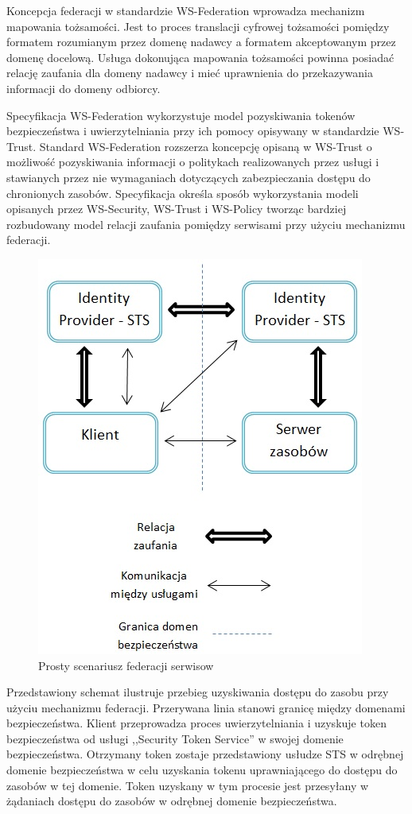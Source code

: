 		Koncepcja federacji w standardzie WS-Federation wprowadza mechanizm mapowania tożsamości. Jest to proces translacji cyfrowej tożsamości pomiędzy formatem rozumianym przez domenę nadawcy a formatem akceptowanym przez domenę docelową. Usługa dokonująca mapowania tożsamości powinna posiadać relację zaufania dla domeny nadawcy i mieć uprawnienia do przekazywania informacji do domeny odbiorcy.

		Specyfikacja WS-Federation wykorzystuje model pozyskiwania tokenów bezpieczeństwa i uwierzytelniania przy ich pomocy opisywany w standardzie WS-Trust. Standard WS-Federation rozszerza koncepcję opisaną w WS-Trust o możliwość pozyskiwania informacji o politykach realizowanych przez usługi i stawianych przez nie wymaganiach dotyczących zabezpieczania dostępu do chronionych zasobów. Specyfikacja określa sposób wykorzystania modeli opisanych przez WS-Security, WS-Trust i WS-Policy tworząc bardziej rozbudowany model relacji zaufania pomiędzy serwisami przy użyciu mechanizmu federacji.

		\begin{figure}[h]
			\centering
				\includegraphics{img/ws-federation.jpg}
			\caption{Prosty scenariusz federacji serwisow}
			\label{Prosty scenariusz federacji serwisów}
		\end{figure}

		Przedstawiony schemat ilustruje przebieg uzyskiwania dostępu do zasobu przy użyciu mechanizmu federacji. Przerywana linia stanowi granicę między domenami bezpieczeństwa. Klient przeprowadza proces uwierzytelniania  i uzyskuje token bezpieczeństwa od usługi ,,Security Token Service'' w swojej domenie bezpieczeństwa. Otrzymany token zostaje przedstawiony usłudze STS w odrębnej domenie bezpieczeństwa w celu uzyskania tokenu uprawniającego do dostępu do zasobów w tej domenie. Token uzyskany w tym procesie jest przesyłany w żądaniach dostępu do zasobów w odrębnej domenie bezpieczeństwa. 

